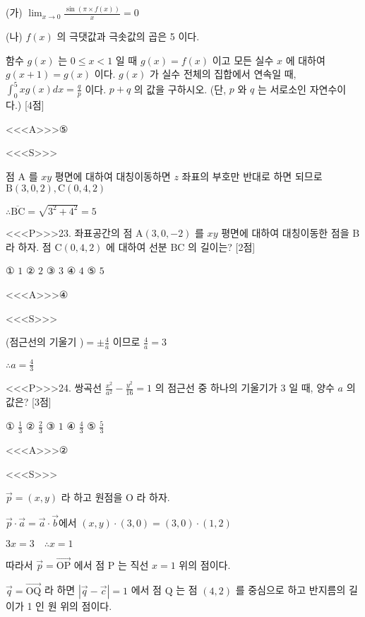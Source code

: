 \documentclass{oblivoir}
\begin{document}
(가) $\lim _{x \rightarrow 0} \frac{\sin (\pi \times f(x))}{x}=0$

(나) $f(x)$ 의 극댓값과 극솟값의 곱은 5 이다.

함수 $g(x)$ 는 $0 \leq x<1$ 일 때 $g(x)=f(x)$ 이고 모든 실수 $x$ 에 대하여 $g(x+1)=g(x)$ 이다.
$g(x)$ 가 실수 전체의 집합에서 연속일 때, $\int_{0}^{5} x g(x) d x=\frac{q}{p}$ 이다. $p+q$ 의 값을 구하시오. (단, $p$ 와 $q$ 는 서로소인 자연수이다.) [4점]



<<<A>>>⑤

<<<S>>>



점 $\mathrm{A}$ 를 $x y$ 평면에 대하여 대칭이동하면 $z$ 좌표의 부호만 반대로 하면 되므로 $\mathrm{B}(3,0,2), \mathrm{C}(0,4,2)$

$\therefore \overline{\mathrm{BC}}=\sqrt{3^{2}+4^{2}}=5$


<<<P>>>23. 좌표공간의 점 $\mathrm{A}(3,0,-2)$ 를 $x y$ 평면에 대하여 대칭이동한 점을 $\mathrm{B}$ 라 하자. 점 $\mathrm{C}(0,4,2)$ 에 대하여 선분 $\mathrm{BC}$ 의 길이는? [2점]

① $1$
② $2$
③ $3$
④ $4$
⑤ $5$


<<<A>>>④

<<<S>>>



(점근선의 기울기 )$=\pm \frac{4}{a}$ 이므로 $\frac{4}{a}=3$

$\therefore a=\frac{4}{3}$


<<<P>>>24. 쌍곡선 $\frac{x^{2}}{a^{2}}-\frac{y^{2}}{16}=1$ 의 점근선 중 하나의 기울기가 3 일 때, 양수 $a$ 의 값은? [3점]

① $\frac{1}{3}$
② $\frac{2}{3}$
③ $1$
④ $\frac{4}{3}$
⑤ $\frac{5}{3}$


<<<A>>>②

<<<S>>>



$ \overrightarrow{p}=(x, y)$ 라 하고 원점을 $\mathrm{O}$ 라 하자.

$\overrightarrow{p} \cdot \overrightarrow{a}=\overrightarrow{a} \cdot \overrightarrow{b}$에서 $(x, y) \cdot(3,0)=(3,0) \cdot(1,2)$

$3 x=3 \quad \therefore x=1$

따라서 $\overrightarrow{p}=\overrightarrow{\mathrm{OP}}$ 에서 점 $\mathrm{P}$ 는 직선 $x=1$ 위의 점이다.

$\overrightarrow{q}=\overrightarrow{\mathrm{OQ}}$ 라 하면 $|\overrightarrow{q}-\overrightarrow{c}|=1$ 에서 점 $\mathrm{Q}$ 는 점 $(4,2)$ 를 중심으로 하고 반지름의 길이가 1 인 원 위의 점이다.
\end{document}
